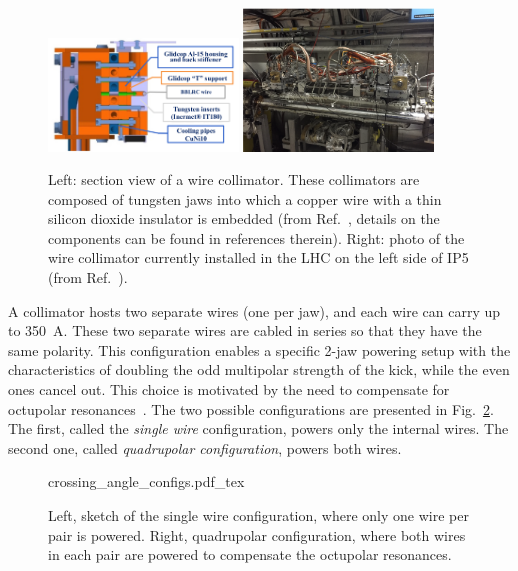 \begin{figure}[t]
    \centering
    \includegraphics[width=0.45\textwidth]{5_wire_compensators_LHC/figs/wire_real_2.png}
    \includegraphics[width=0.45\textwidth]{5_wire_compensators_LHC/figs/wire_real_1.png}
    \caption{Left: section view of a wire collimator. These  collimators are composed of tungsten jaws into which a copper wire with a thin silicon dioxide insulator is embedded (from Ref.~\cite{Rossi:2696270}, details on the components can be found in references therein). Right: photo of the wire collimator currently installed in the LHC on the left side of IP5 (from Ref.~\cite{axel.wires}).}
    \label{fig:wire_compensator_photo}
\end{figure}

A collimator hosts two separate wires (one per jaw), and each wire can carry up to \SI{350}{\ampere}. These two separate wires are cabled in series so that they have the same polarity. This configuration enables a specific 2-jaw powering setup with the characteristics of doubling the odd multipolar strength of the kick, while the even ones cancel out. This choice is motivated by the need to compensate for octupolar resonances~\cite{Poyet:2703503}. The two possible configurations are presented in Fig.~\ref{fig:wire-configs}. The first, called the \textit{single wire} configuration, powers only the internal wires. The second one, called \textit{quadrupolar configuration}, powers both wires.

\begin{figure}[th]
    \centering
    \def\svgwidth{1.0\textwidth}
    {crossing_angle_configs.pdf_tex}
    \caption{Left, sketch of the single wire configuration, where only one wire per pair is powered. Right, quadrupolar configuration, where both wires in each pair are powered to compensate the octupolar resonances.}
    \label{fig:wire-configs}
\end{figure}

